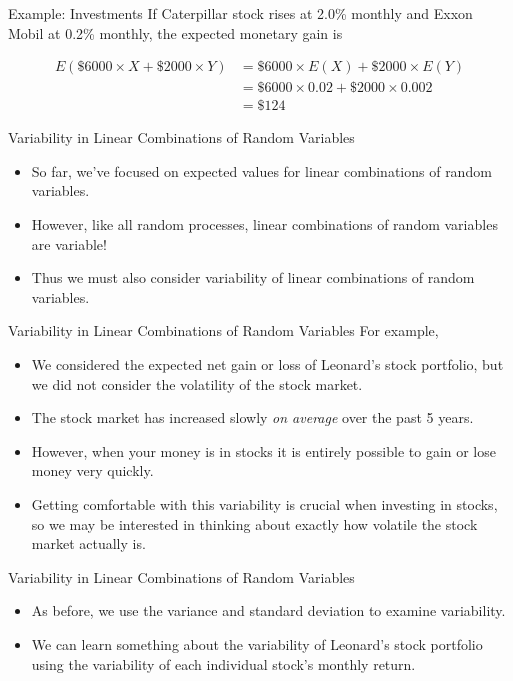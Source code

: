 \begin{frame}{Example: Investments}
    If Caterpillar stock rises at 2.0\% monthly and Exxon Mobil at 0.2\% monthly, the expected monetary gain is 
    
    \begin{align*}
        E(\$6000\times X + \$2000\times Y) &= \$6000\times E(X) + \$2000\times E(Y) \\
        &= \$6000\times 0.02 + \$2000\times 0.002 \\
        &= \$124
    \end{align*}
\end{frame}

\begin{frame}{Variability in Linear Combinations of Random Variables}
    \begin{itemize}
        \item So far, we've focused on expected values for linear combinations of random variables.
        \item However, like all random processes, linear combinations of random variables are variable!
        \item Thus we must also consider variability of linear combinations of random variables.
    \end{itemize}
\end{frame}

\begin{frame}{Variability in Linear Combinations of Random Variables}
    For example,
    \begin{itemize}
        \item We considered the expected net gain or loss of Leonard’s stock portfolio, but we did not consider the volatility of the stock market.
        \item The stock market has increased slowly \textit{on average} over the past 5 years.
        \item However, when your money is in stocks it is entirely possible to gain or lose money very quickly. 
        \item Getting comfortable with this variability is crucial when investing in stocks, so we may be interested in thinking about exactly how volatile the stock market actually is.
    \end{itemize}
\end{frame}

\begin{frame}{Variability in Linear Combinations of Random Variables}
    \begin{itemize}
        \item As before, we use the variance and standard deviation to examine variability.
        \item We can learn something about the variability of Leonard's stock portfolio using the variability of each individual stock's monthly return.
    \end{itemize}
\end{frame}


